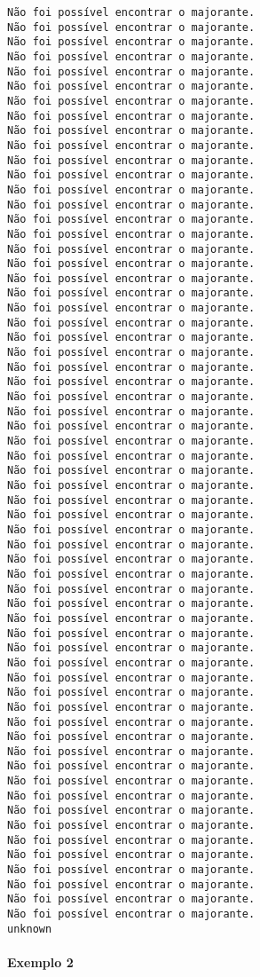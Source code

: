 \documentclass[11pt]{article}
\begin{document}
\begin{Verbatim}[commandchars=\\\{\}]
Não foi possível encontrar o majorante.
Não foi possível encontrar o majorante.
Não foi possível encontrar o majorante.
Não foi possível encontrar o majorante.
Não foi possível encontrar o majorante.
Não foi possível encontrar o majorante.
Não foi possível encontrar o majorante.
Não foi possível encontrar o majorante.
Não foi possível encontrar o majorante.
Não foi possível encontrar o majorante.
Não foi possível encontrar o majorante.
Não foi possível encontrar o majorante.
Não foi possível encontrar o majorante.
Não foi possível encontrar o majorante.
Não foi possível encontrar o majorante.
Não foi possível encontrar o majorante.
Não foi possível encontrar o majorante.
Não foi possível encontrar o majorante.
Não foi possível encontrar o majorante.
Não foi possível encontrar o majorante.
Não foi possível encontrar o majorante.
Não foi possível encontrar o majorante.
Não foi possível encontrar o majorante.
Não foi possível encontrar o majorante.
Não foi possível encontrar o majorante.
Não foi possível encontrar o majorante.
Não foi possível encontrar o majorante.
Não foi possível encontrar o majorante.
Não foi possível encontrar o majorante.
Não foi possível encontrar o majorante.
Não foi possível encontrar o majorante.
Não foi possível encontrar o majorante.
Não foi possível encontrar o majorante.
Não foi possível encontrar o majorante.
Não foi possível encontrar o majorante.
Não foi possível encontrar o majorante.
Não foi possível encontrar o majorante.
Não foi possível encontrar o majorante.
Não foi possível encontrar o majorante.
Não foi possível encontrar o majorante.
Não foi possível encontrar o majorante.
Não foi possível encontrar o majorante.
Não foi possível encontrar o majorante.
Não foi possível encontrar o majorante.
Não foi possível encontrar o majorante.
Não foi possível encontrar o majorante.
Não foi possível encontrar o majorante.
Não foi possível encontrar o majorante.
Não foi possível encontrar o majorante.
Não foi possível encontrar o majorante.
Não foi possível encontrar o majorante.
Não foi possível encontrar o majorante.
Não foi possível encontrar o majorante.
Não foi possível encontrar o majorante.
Não foi possível encontrar o majorante.
Não foi possível encontrar o majorante.
Não foi possível encontrar o majorante.
Não foi possível encontrar o majorante.
Não foi possível encontrar o majorante.
Não foi possível encontrar o majorante.
Não foi possível encontrar o majorante.
Não foi possível encontrar o majorante.
unknown
    \end{Verbatim}

    \hypertarget{exemplo-2}{%
\paragraph{Exemplo 2}\label{exemplo-2}}
\end{document}
